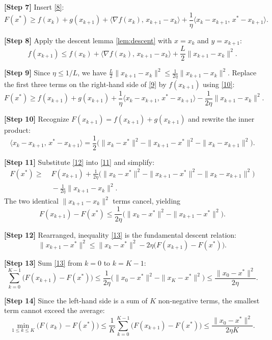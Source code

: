 \documentclass{article}
\begin{document}
\noindent\textbf{[Step 7]} Insert \eqref{8}:
\[
F(x^{*})\ge f(x_{k})+g(x_{k+1})
+\langle \nabla f(x_{k}),\,x_{k+1}-x_{k}\rangle
+\frac{1}{\eta}\langle x_{k}-x_{k+1},\,x^{*}-x_{k+1}\rangle . \tag{9}
\]

\noindent\textbf{[Step 8]} Apply the descent lemma \eqref{lem:descent} with $x=x_{k}$ and $y=x_{k+1}$:
\[
f(x_{k+1})\le f(x_{k})+\langle \nabla f(x_{k}),\,x_{k+1}-x_{k}\rangle
+\frac{L}{2}\|x_{k+1}-x_{k}\|^{2}. \tag{10}
\]

\noindent\textbf{[Step 9]} Since $\eta\le 1/L$, we have $\frac{L}{2}\|x_{k+1}-x_{k}\|^{2}\le\frac{1}{2\eta}\|x_{k+1}-x_{k}\|^{2}$.  
Replace the first three terms on the right‑hand side of \eqref{9} by $f(x_{k+1})$ using \eqref{10}:
\[
F(x^{*})\ge f(x_{k+1})+g(x_{k+1})
+\frac{1}{\eta}\langle x_{k}-x_{k+1},\,x^{*}-x_{k+1}\rangle
-\frac{1}{2\eta}\|x_{k+1}-x_{k}\|^{2}. \tag{11}
\]

\noindent\textbf{[Step 10]} Recognize $F(x_{k+1})=f(x_{k+1})+g(x_{k+1})$ and rewrite the inner product:
\[
\langle x_{k}-x_{k+1},\,x^{*}-x_{k+1}\rangle
=\frac{1}{2}\Big(\|x_{k}-x^{*}\|^{2}-\|x_{k+1}-x^{*}\|^{2}-\|x_{k}-x_{k+1}\|^{2}\Big). \tag{12}
\]

\noindent\textbf{[Step 11]} Substitute \eqref{12} into \eqref{11} and simplify:
\[
\begin{aligned}
F(x^{*})\ge&\; F(x_{k+1})
+\frac{1}{2\eta}\Big(\|x_{k}-x^{*}\|^{2}-\|x_{k+1}-x^{*}\|^{2}
-\|x_{k}-x_{k+1}\|^{2}\Big)\\
&\;-\frac{1}{2\eta}\|x_{k+1}-x_{k}\|^{2}.
\end{aligned}
\] 
The two identical $\|x_{k+1}-x_{k}\|^{2}$ terms cancel, yielding
\[
F(x_{k+1})-F(x^{*})\le \frac{1}{2\eta}\Big(\|x_{k}-x^{*}\|^{2}-\|x_{k+1}-x^{*}\|^{2}\Big). \tag{13}
\]

\noindent\textbf{[Step 12]} Rearranged, inequality \eqref{13} is the fundamental descent relation:
\[
\boxed{ \; \|x_{k+1}-x^{*}\|^{2}\le \|x_{k}-x^{*}\|^{2}
-2\eta\bigl(F(x_{k+1})-F(x^{*})\bigr). \;}
\] 

\noindent\textbf{[Step 13]} Sum \eqref{13} from $k=0$ to $k=K-1$:
\[
\sum_{k=0}^{K-1}\bigl(F(x_{k+1})-F(x^{*})\bigr)
\le \frac{1}{2\eta}\bigl(\|x_{0}-x^{*}\|^{2}-\|x_{K}-x^{*}\|^{2}\bigr)
\le \frac{\|x_{0}-x^{*}\|^{2}}{2\eta}. \tag{14}
\]

\noindent\textbf{[Step 14]} Since the left‑hand side is a sum of $K$ non‑negative terms, the smallest term cannot exceed the average:
\[
\min_{1\le k\le K}\bigl(F(x_{k})-F(x^{*})\bigr)
\le \frac{1}{K}\sum_{k=0}^{K-1}\bigl(F(x_{k+1})-F(x^{*})\bigr)
\le \frac{\|x_{0}-x^{*}\|^{2}}{2\eta K}. \tag{15}
\]
\end{document}
